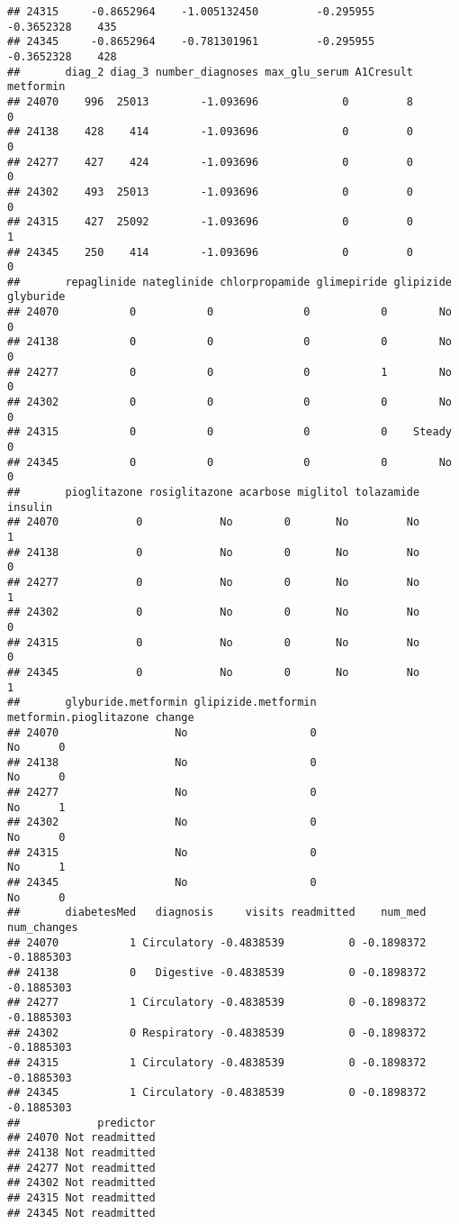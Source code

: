 \documentclass[
]{article}
\begin{document}
\begin{verbatim}
## 24315     -0.8652964    -1.005132450         -0.295955       -0.3652328    435
## 24345     -0.8652964    -0.781301961         -0.295955       -0.3652328    428
##       diag_2 diag_3 number_diagnoses max_glu_serum A1Cresult metformin
## 24070    996  25013        -1.093696             0         8         0
## 24138    428    414        -1.093696             0         0         0
## 24277    427    424        -1.093696             0         0         0
## 24302    493  25013        -1.093696             0         0         0
## 24315    427  25092        -1.093696             0         0         1
## 24345    250    414        -1.093696             0         0         0
##       repaglinide nateglinide chlorpropamide glimepiride glipizide glyburide
## 24070           0           0              0           0        No         0
## 24138           0           0              0           0        No         0
## 24277           0           0              0           1        No         0
## 24302           0           0              0           0        No         0
## 24315           0           0              0           0    Steady         0
## 24345           0           0              0           0        No         0
##       pioglitazone rosiglitazone acarbose miglitol tolazamide insulin
## 24070            0            No        0       No         No       1
## 24138            0            No        0       No         No       0
## 24277            0            No        0       No         No       1
## 24302            0            No        0       No         No       0
## 24315            0            No        0       No         No       0
## 24345            0            No        0       No         No       1
##       glyburide.metformin glipizide.metformin metformin.pioglitazone change
## 24070                  No                   0                     No      0
## 24138                  No                   0                     No      0
## 24277                  No                   0                     No      1
## 24302                  No                   0                     No      0
## 24315                  No                   0                     No      1
## 24345                  No                   0                     No      0
##       diabetesMed   diagnosis     visits readmitted    num_med num_changes
## 24070           1 Circulatory -0.4838539          0 -0.1898372  -0.1885303
## 24138           0   Digestive -0.4838539          0 -0.1898372  -0.1885303
## 24277           1 Circulatory -0.4838539          0 -0.1898372  -0.1885303
## 24302           0 Respiratory -0.4838539          0 -0.1898372  -0.1885303
## 24315           1 Circulatory -0.4838539          0 -0.1898372  -0.1885303
## 24345           1 Circulatory -0.4838539          0 -0.1898372  -0.1885303
##            predictor
## 24070 Not readmitted
## 24138 Not readmitted
## 24277 Not readmitted
## 24302 Not readmitted
## 24315 Not readmitted
## 24345 Not readmitted
\end{verbatim}
\end{document}
